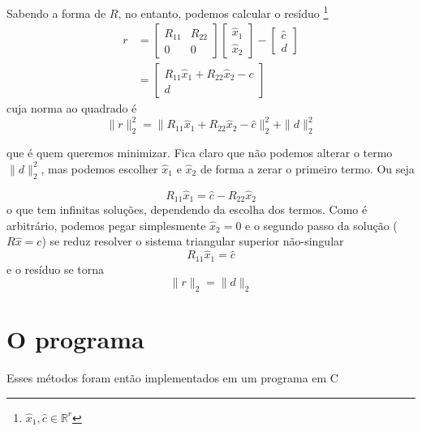 \documentclass[a4paper,11pt]{article}
\begin{document}
        Sabendo a forma de $R$, no entanto, podemos calcular o resíduo \footnote{$\hat{x}_1, \hat{c} \in \mathbb{R}^{r}$}
        \begin{align*}
            r &=
            \begin{bmatrix}
                R_{11} & R_{22} \\
                     0 &      0
            \end{bmatrix}
            \begin{bmatrix}
                \hat{x}_1 \\
                \hat{x}_2
            \end{bmatrix}
            -
            \begin{bmatrix}
                \hat{c} \\
                d
            \end{bmatrix} \\
            &=
            \begin{bmatrix}
                R_{11}\hat{x}_1 + R_{22}\hat{x}_2 - c \\
                d
            \end{bmatrix}
        \end{align*}
        cuja norma ao quadrado é
        $$ \|r\|_2^2 = \|R_{11}\hat{x}_1 + R_{22}\hat{x}_2 - \hat{c}\|_2^2 + \|d\|_2^2$$

        que é quem queremos minimizar. Fica claro que não podemos alterar o termo $\|d\|_2^2$, mas podemos escolher $\hat{x}_1$ e $\hat{x}_2$ de forma a zerar o primeiro termo. Ou seja

        $$ R_{11}\hat{x}_1 = \hat{c} - R_{22}\hat{x}_2$$
        o que tem infinitas soluções, dependendo da escolha dos termos. Como é arbitrário, podemos pegar simplesmente $\hat{x}_2 = 0$ e o segundo passo da solução ($R\hat{x} = c$) se reduz resolver o sistema triangular superior não-singular
        $$ R_{11}\hat{x}_1 = \hat{c} $$
        e o resíduo se torna
        $$ \|r\|_2 = \|d\|_2 $$

    \section*{O programa}
        Esses métodos foram então implementados em um programa em C
\end{document}
